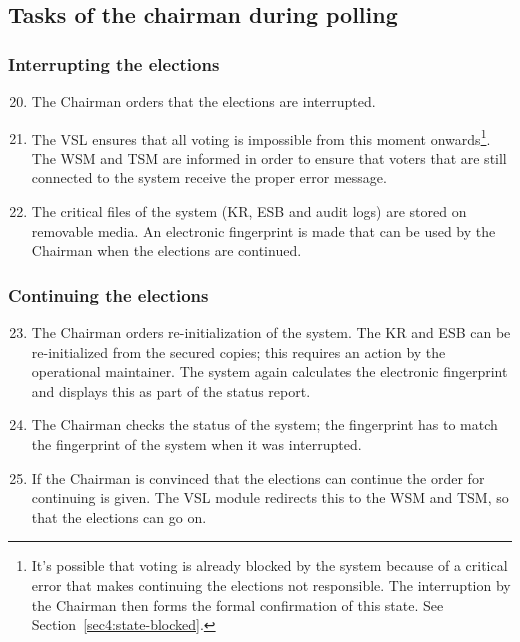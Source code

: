 \subsection{Tasks of the chairman during polling}\label{sec3:tasks-chairm-during}

\subsubsection{Interrupting the elections}\label{sec3:interr-elect}

\begin{enumerate}
\setcounter{enumi}{19}
	\item The Chairman orders that the elections are interrupted.

	\item The VSL ensures that all voting is impossible from this
	moment onwards\footnote{It's possible that voting is already
	blocked by the system because of a critical error that makes
	continuing the elections not responsible. The interruption by
	the Chairman then forms the formal confirmation of this
	state. See Section~\ref{sec4:state-blocked}.}. The WSM and TSM
	are informed in order to ensure that voters that are still
	connected to the system receive the proper error message.

	\item The critical files of the system (KR, ESB and audit
	logs) are stored on removable media. An electronic fingerprint
	is made that can be used by the Chairman when the elections
	are continued.

\end{enumerate}

\subsubsection{Continuing the elections}\label{sec3:continuing-elections}

\begin{enumerate}
\setcounter{enumi}{22}
	\item The Chairman orders re-initialization of the system. The
	KR and ESB can be re-initialized from the secured copies; this
	requires an action by the operational maintainer. The system
	again calculates the electronic fingerprint and displays this
	as part of the status report.

	\item The Chairman checks the status of the system; the
	fingerprint has to match the fingerprint of the system when it
	was interrupted.

	\item If the Chairman is convinced that the elections can
	continue the order for continuing is given. The VSL module
	redirects this to the WSM and TSM, so that the elections can
	go on.

\end{enumerate}

